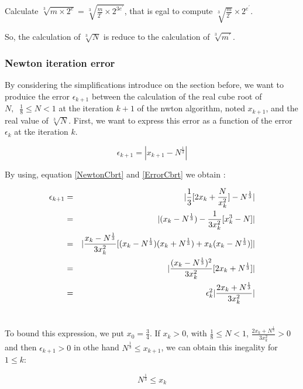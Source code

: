 \documentclass[12pt]{amsart}
\begin{document}
Calculate $\sqrt[3]{m \times 2^e} = \sqrt[3]{\frac{m}{2^r} \times 2^{3 e^{'}}}$, that is egal to
compute $\sqrt[3]{\frac{m}{2^r}} \times 2^{e^{'}}$.


So, the calculation of $\sqrt[3]{N}$ is reduce to the calculation of
$\sqrt[3]{m^{'}}$.

\subsubsection{Newton iteration error}

By considering the simplifications introduce on the section before, we
want to produice the error $\epsilon_{k+1}$ between the calculation of the real cube
root of $N, \;\; \frac{1}{8}\leq N < 1$ at the iteration $k+1$ of the
nwton algorithm, noted $x_{k+1}$, and the real value of
$\sqrt[3]{N}$. First, we want to express this error as a function of
the error $\epsilon_{k}$ at tke iteration $k$.

\begin{equation}\label{ErrorCbrt}
\epsilon_{k+1}= |x_{k+1}-N^{\frac{1}{3}}|
\end{equation}

By using, equation \ref{NewtonCbrt} and \ref{ErrorCbrt} we obtain :

\begin{eqnarray}\nonumber
\epsilon_{k+1}&=&   \arrowvert\frac{1}{3}[2x_k+\frac{N}{x^2_k}]-N^{\frac{1}{3}} \arrowvert\\\nonumber
  &=& \arrowvert (x_k-N^{\frac{1}{3}})-\frac{1}{3x^2_k}[x^3_k-N] \arrowvert \\\nonumber
  &=& \arrowvert
  \frac{x_k-N^{\frac{1}{3}}}{3x^2_k}[(x_k-N^{\frac{1}{3}})(x_k+N^{\frac{1}{3}})+x_k(x_k-N^{\frac{1}{3}})] \arrowvert\\\nonumber
  &=&\arrowvert \frac{(x_k-N^{\frac{1}{3}})^2}{3x^2_k}
  [2x_k+N^{\frac{1}{3}}]\arrowvert\\\nonumber
  &=&  \epsilon^2_{k}\arrowvert \frac{2x_k+N^{\frac{1}{3}}}{3x^2_k}\arrowvert\\\nonumber
\end{eqnarray}

To bound this expression, we put $x_0=\frac{3}{4}$. If $x_k >0 $, with
$\frac{1}{8}\leq N <1$, $\frac{2x_k+N^{\frac{1}{3}}}{3x^2_k} >0 $ and
then $\epsilon_{k+1} >0$ in othe hand $ N^{\frac{1}{3}}\leq x_{k+1}$,
we can obtain this inegality for $1 \leq k$:

\begin{equation}
N^{\frac{1}{3}}\leq x_{k}
\end{equation}
\end{document}
